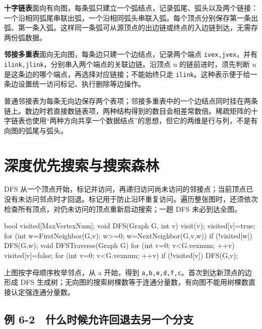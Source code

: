 \textbf{十字链表}面向有向图，每条弧只建立一个弧结点，记录弧尾、弧头以及两个链接：一个沿相同弧尾串联出弧，一个沿相同弧头串联入弧。每个顶点分别保存第一条出弧、第一条入弧。这样同一条弧可从源顶点的出边链或终点的入边链到达，无需存两份弧数据。

\textbf{邻接多重表}面向无向图，每条边只建一个边结点，记录两个端点 \texttt{ivex,\allowbreak{}jvex}，并有 \texttt{ilink,\allowbreak{}jlink}，分别串入两个端点的关联边链。沿顶点 u 的链前进时，须先判断 u 是这条边的哪个端点，再选择对应链接；不能始终只走 \texttt{ilink}。这种表示便于给一条边设置统一访问标记、执行删除等边操作。

普通邻接表为每条无向边保存两个表项；邻接多重表中的一个边结点同时挂在两条链上。数边时若直接数链表项，两种结构得到的数目会相差常数倍。稀疏矩阵的十字链表也使用``两种方向共享一个数据结点''的思想，但它的两维是行与列，不是有向图的弧尾与弧头。

\section{深度优先搜索与搜索森林}\label{DS06-04}

DFS 从一个顶点开始，标记并访问，再递归访问尚未访问的邻接点；当前顶点已没有未访问邻点时才回退。标记用于防止沿环重复访问。遍历整张图时，还须依次检查所有顶点，对仍未访问的顶点重新启动搜索；一趟 DFS 未必到达全图。

\par\medskip\noindent\begin{minipage}{\linewidth}
\begin{codeblock}[language=C++]
bool visited[MaxVertexNum];
void DFS(Graph G, int v) {
    visit(v);
    visited[v]=true;
    for (int w=FirstNeighbor(G,v); w>=0;
         w=NextNeighbor(G,v,w))
        if (!visited[w]) DFS(G,w);
}
void DFSTraverse(Graph G) {
    for (int v=0; v<G.vexnum; ++v) visited[v]=false;
    for (int v=0; v<G.vexnum; ++v)
        if (!visited[v]) DFS(G,v);
}
\end{codeblock}
\end{minipage}\par\medskip

上图按字母顺序枚举邻点，从 a 开始，得到 \texttt{a,\allowbreak{}b,\allowbreak{}e,\allowbreak{}d,\allowbreak{}f,\allowbreak{}c}。首次到达新顶点的边形成 DFS 生成树；无向图的搜索树棵数等于连通分量数，有向图不能用树棵数直接认定强连通分量数。

\subsection{例 6-2　什么时候允许回退去另一个分支}\label{DS06-ex2}

